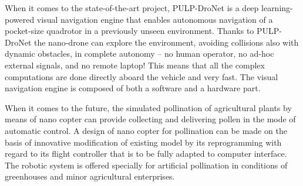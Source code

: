 When it comes to the state-of-the-art project, PULP-DroNet is a deep learning-powered visual navigation engine that enables autonomous navigation of a pocket-size quadrotor in a previously unseen environment. Thanks to PULP-DroNet the nano-drone can explore the environment, avoiding collisions also with dynamic obstacles, in complete autonomy -- no human operator, no ad-hoc external signals, and no remote laptop! This means that all the complex computations are done directly aboard the vehicle and very fast. The visual navigation engine is composed of both a software and a hardware part. \cite{Niculescu2021}

When it comes to the future, the simulated pollination of agricultural plants by means of nano copter can provide collecting and delivering pollen in the mode of automatic control. A design of nano copter for pollination can be made on the basis of innovative modification of existing model by its reprogramming with regard to its flight controller that is to be fully adapted to computer interface. The robotic system is offered specially for artificial pollination in conditions of greenhouses and minor agricultural enterprises. \cite{Abutalipov2016}